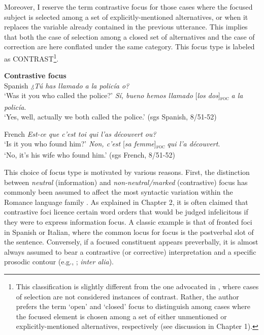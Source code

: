 Moreover, I reserve the term contrastive focus for those cases where the focused subject is selected among a set of explicitly-mentioned alternatives, or when it replaces the variable already contained in the previous utterance. This implies that both the case of selection among a closed set of alternatives \parencite{chafe1976givenness} and the case of correction \parencite{van2004incompatibility, steube2001correction, gussenhoven2008types, REPP20101333, riester2013focus, lahousse2014distribution} are here conflated under the same category. This focus type is labeled as {\selectfont CONTRAST}\footnote{This classification is slightly different from the one advocated in \textcite{krifka2008basic}, where cases of selection are not considered instances of contrast. Rather, the author prefers the term `open' and `closed' focus to distinguish among cases where the focused element is chosen among a set of either unmentioned or explicitly-mentioned alternatives, respectively (see discussion in Chapter 1).}.


\textbf{Contrastive focus}\\
 \ea \label{ex:3:54} Spanish
\ea \textit{	¿Tú has llamado a la policía  o?}\\
 ‘Was it you who called the police?'
\ex \textit{ Sí, bueno hemos llamado} {[\textit{los dos}]\textsubscript{\textsc{foc}}} \textit{a la policía}.\\
‘Yes, well, actually we both called the police.' \hfill (sgs Spanish, 8/51-52)   
\z \z 

 \ea \label{ex:3:55} French
\ea 	\textit{Est-ce que c'est toi qui l'as découvert ou?}\\
 ‘Is it you who found him?'
\ex  \textit{Non, c'est} {[\textit{sa femme}]\textsubscript{\textsc{foc}}} \normalsize \textit{qui l'a découvert}.\\
‘No, it's his wife who found him.' \hfill (sgs French, 8/51-52)    
\z \z 


This choice of focus type is motivated by various reasons. First, the distinction between \textit{neutral} (information) and \textit{non-neutral/marked} (contrastive) focus has commonly been assumed to affect the most syntactic variation within the Romance language family  \parencite{vidal2019nota, cruschina2021}. As explained in Chapter 2, it is often claimed that contrastive foci licence certain word orders that would be judged infelicitous if they were to express information focus. A classic example is that of fronted foci in Spanish or Italian, where the common locus for focus is the postverbal slot of the sentence. Conversely, if a focused constituent appears preverbally, it is almost always assumed to bear a contrastive (or corrective) interpretation and a specific prosodic contour (e.g., \cite{beninca1988ordine, bianchi2013focus, vidal2019nota}; \textit{inter alia}).


